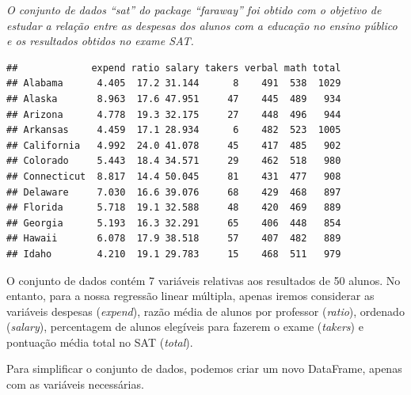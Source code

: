 \documentclass[]{article}
\begin{document}
\textit{O conjunto de dados “sat” do package “faraway” foi obtido com o objetivo de estudar
a relação entre as despesas dos alunos com a educação no ensino público e os resultados
obtidos no exame SAT.}

\begin{Shaded}
\begin{Highlighting}[]
\NormalTok{)}
\end{Highlighting}
\end{Shaded}

\begin{verbatim}
##             expend ratio salary takers verbal math total
## Alabama      4.405  17.2 31.144      8    491  538  1029
## Alaska       8.963  17.6 47.951     47    445  489   934
## Arizona      4.778  19.3 32.175     27    448  496   944
## Arkansas     4.459  17.1 28.934      6    482  523  1005
## California   4.992  24.0 41.078     45    417  485   902
## Colorado     5.443  18.4 34.571     29    462  518   980
## Connecticut  8.817  14.4 50.045     81    431  477   908
## Delaware     7.030  16.6 39.076     68    429  468   897
## Florida      5.718  19.1 32.588     48    420  469   889
## Georgia      5.193  16.3 32.291     65    406  448   854
## Hawaii       6.078  17.9 38.518     57    407  482   889
## Idaho        4.210  19.1 29.783     15    468  511   979
\end{verbatim}

O conjunto de dados contém 7 variáveis relativas aos resultados de 50
alunos. No entanto, para a nossa regressão linear múltipla, apenas
iremos considerar as variáveis despesas (\emph{expend}), razão média de
alunos por professor (\emph{ratio}), ordenado (\emph{salary}),
percentagem de alunos elegíveis para fazerem o exame (\emph{takers}) e
pontuação média total no SAT (\emph{total}).

Para simplificar o conjunto de dados, podemos criar um novo DataFrame,
apenas com as variáveis necessárias.

\begin{Shaded}
\begin{Highlighting}[]
\OtherTok{\textless{}{-}}\NormalTok{ sat[, }\NormalTok{(}\NormalTok{, }\NormalTok{, }\NormalTok{, }\NormalTok{, }\NormalTok{)]}
\NormalTok{)}
\end{Highlighting}
\end{Shaded}
\end{document}
